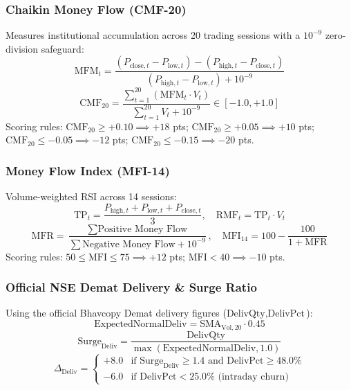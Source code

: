 \documentclass[11pt,a4paper]{article}
\begin{document}
\subsubsection{Chaikin Money Flow (CMF-20)}
Measures institutional accumulation across 20 trading sessions with a $10^{-9}$ zero-division safeguard:
\begin{equation}
\text{MFM}_t = \frac{(P_{\text{close}, t} - P_{\text{low}, t}) - (P_{\text{high}, t} - P_{\text{close}, t})}{(P_{\text{high}, t} - P_{\text{low}, t}) + 10^{-9}}
\end{equation}
\begin{equation}
\text{CMF}_{20} = \frac{\sum_{t=1}^{20} (\text{MFM}_t \cdot V_t)}{\sum_{t=1}^{20} V_t + 10^{-9}} \in [-1.0, +1.0]
\end{equation}
Scoring rules: $\text{CMF}_{20} \ge +0.10 \implies +18$ pts; $\text{CMF}_{20} \ge +0.05 \implies +10$ pts; $\text{CMF}_{20} \le -0.05 \implies -12$ pts; $\text{CMF}_{20} \le -0.15 \implies -20$ pts.

\subsubsection{Money Flow Index (MFI-14)}
Volume-weighted RSI across 14 sessions:
\begin{equation}
\text{TP}_t = \frac{P_{\text{high}, t} + P_{\text{low}, t} + P_{\text{close}, t}}{3}, \quad \text{RMF}_t = \text{TP}_t \cdot V_t
\end{equation}
\begin{equation}
\text{MFR} = \frac{\sum \text{Positive Money Flow}}{\sum \text{Negative Money Flow} + 10^{-9}}, \quad \text{MFI}_{14} = 100 - \frac{100}{1 + \text{MFR}}
\end{equation}
Scoring rules: $50 \le \text{MFI} \le 75 \implies +12$ pts; $\text{MFI} < 40 \implies -10$ pts.

\subsubsection{Official NSE Demat Delivery \& Surge Ratio}
Using the official Bhavcopy Demat delivery figures ($\text{DelivQty}, \text{DelivPct}$):
\begin{equation}
\text{ExpectedNormalDeliv} = \text{SMA}_{\text{Vol}, 20} \cdot 0.45
\end{equation}
\begin{equation}
\text{Surge}_{\text{Deliv}} = \frac{\text{DelivQty}}{\max(\text{ExpectedNormalDeliv}, 1.0)}
\end{equation}
\begin{equation}
\Delta_{\text{Deliv}} = \begin{cases}
+8.0 & \text{if } \text{Surge}_{\text{Deliv}} \ge 1.4 \text{ and } \text{DelivPct} \ge 48.0\% \\
-6.0 & \text{if } \text{DelivPct} < 25.0\% \text{ (intraday churn)}
\end{cases}
\end{equation}
\end{document}
